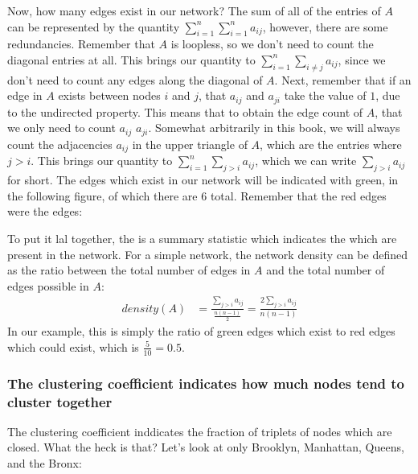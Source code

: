 \documentclass[letterpaper,10pt,english]{jupyterBook}
\begin{document}
\noindent{}

\sphinxAtStartPar
Now, how many edges  exist in our network? The sum of all of the entries of \(A\) can be represented by the quantity \(\sum_{i = 1}^n \sum_{i = 1}^n a_{ij}\), however, there are some redundancies. Remember that \(A\) is loopless, so we don’t need to count the diagonal entries at all. This brings our quantity to \(\sum_{i = 1}^n \sum_{i \neq j}a_{ij}\), since we don’t need to count any edges along the diagonal of \(A\). Next, remember that if an edge in \(A\) exists between nodes \(i\) and \(j\), that  \(a_{ij}\) and \(a_{ji}\) take the value of \(1\), due to the undirected property. This means that to obtain the edge count of \(A\), that we only need to count  \(a_{ij}\)  \(a_{ji}\). Somewhat arbitrarily in this book, we will always count the adjacencies \(a_{ij}\) in the upper triangle of \(A\), which are the entries where \(j > i\). This brings our quantity to \(\sum_{i = 1}^n \sum_{j > i} a_{ij}\), which we can write \(\sum_{j > i}a_{ij}\) for short. The edges which exist in our network will be indicated with green, in the following figure, of which there are \(6\) total. Remember that the red edges were the  edges:

\noindent{}

\sphinxAtStartPar
To put it lal together, the  is a summary statistic which indicates the  which are present in the network. For a simple network, the network density can be defined as the ratio between the total number of edges in \(A\) and the total number of edges possible in \(A\):
\begin{align*}
    density(A) &= \frac{\sum_{j > i}a_{ij}}{\frac{n(n - 1)}{2}} = \frac{2\sum_{j > i}a_{ij}}{n(n - 1)}
\end{align*}
\sphinxAtStartPar
In our example, this is simply the ratio of green edges which  exist to red edges which could  exist, which is \(\frac{5}{10} = 0.5\).


\subsubsection{The clustering coefficient indicates how much nodes tend to cluster together}
\label{\detokenize{representations/ch4/properties-of-networks:the-clustering-coefficient-indicates-how-much-nodes-tend-to-cluster-together}}
\sphinxAtStartPar
The clustering coefficient inddicates the fraction of triplets of nodes which are closed. What the heck is that? Let’s look at only Brooklyn, Manhattan, Queens, and the Bronx:
\end{document}
